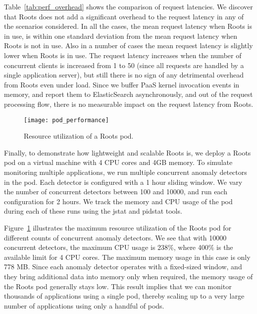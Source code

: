Table~\ref{tab:perf_overhead} shows the comparison of request 
latencies. We discover that Roots does not add a significant overhead
to the request latency in any of the scenarios considered. In all the cases,
the mean request latency when Roots is in use, is within one standard deviation
from the mean request latency when Roots is not in use. Also in a number
of cases the mean request latency is slightly lower when Roots is in use.
The request latency increases when the number of concurrent clients is
increased from 1 to 50 (since all requests are handled by a single
application server), but still there is no sign of any detrimental overhead
from Roots even under load. Since we buffer PaaS kernel invocation
events in memory, and report them to ElasticSearch asynchronously, and
out of the request processing flow, there is no measurable impact on
the request latency from Roots.

\begin{figure}
\centering
\texttt{[image: pod\_performance]}
\caption{Resource utilization of a Roots pod.}
\label{fig:pod_performance}
\end{figure}

Finally, to demonstrate how lightweight and scalable Roots is, we deploy
a Roots pod on a virtual machine with 4 CPU cores and 4GB memory.
To simulate monitoring multiple applications, we run multiple concurrent anomaly
detectors in the pod. Each detector is configured with a 1 hour sliding window.
We vary the number of concurrent
detectors between 100 and 10000, and run each configuration for
2 hours. We track the memory and CPU usage of the
pod during each of these runs using the jstat and pidstat tools. 

Figure~\ref{fig:pod_performance}
illustrates the maximum resource utilization of the Roots pod for different counts of
concurrent anomaly detectors. We see that with 10000 concurrent
detectors, the maximum CPU usage is 238\%, where 400\% is the available limit
for 4 CPU cores. The maximum memory usage in this case is only 778 MB. 
Since each anomaly detector operates with a fixed-sized window, and they
bring additional data into memory only when required, the memory
usage of the Roots pod generally stays low. This result implies that we can monitor thousands 
of applications using a single pod, thereby scaling up to a very large number
of applications using only a handful of pods.